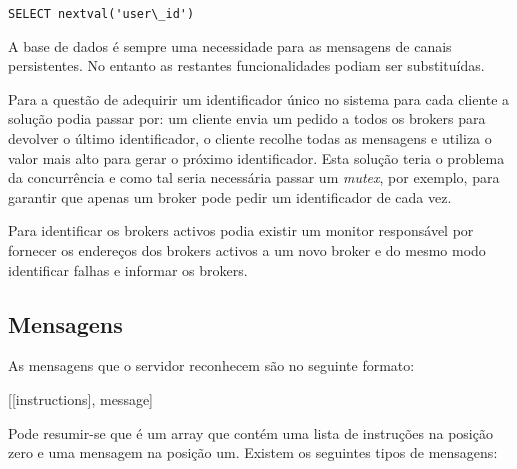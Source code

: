 \begin{lstlisting}
SELECT nextval('user\_id')
\end{lstlisting}


A base de dados é sempre uma necessidade para as mensagens de canais persistentes.
No entanto as restantes funcionalidades podiam ser substituídas.

Para a questão de adequirir um identificador único no sistema para cada cliente a solução podia passar por:
um cliente envia um pedido a todos os brokers para devolver o último identificador, o cliente recolhe todas as mensagens e utiliza o valor mais alto para gerar o próximo identificador. Esta solução teria o problema da concurrência e como tal seria necessária passar um \textit{mutex}, por exemplo, para garantir que apenas um broker pode pedir um identificador de cada vez.

Para identificar os brokers activos podia existir um monitor responsável por fornecer os endereços dos brokers activos a um novo broker e do mesmo modo identificar falhas e informar os brokers.

\subsection{Mensagens}

As mensagens que o servidor reconhecem são no seguinte formato:

[[instructions], message]

Pode resumir-se que é um array que contém uma lista de instruções na posição zero e uma mensagem na posição um. Existem os seguintes tipos de mensagens:

